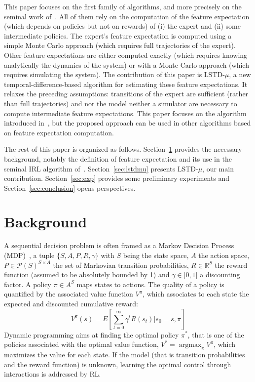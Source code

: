 \documentclass{jfpda2011}
\newcommand{\argmax}{\operatorname*{argmax}} %
\begin{document}
This paper focuses on the first family of algorithms, and more
precisely on the seminal work of~\citet{abbeel2004apprenticeship}. All of them
rely on the computation of the feature expectation (which depends on
policies but not on rewards) of (i) the expert and (ii) some
intermediate policies. The expert's feature expectation is computed
using a simple Monte Carlo approach (which requires full
trajectories of the expert). Other feature expectations are either
computed exactly (which requires knowing analytically the dynamics
of the system) or with a Monte Carlo approach (which requires simulating the system). The contribution of this paper is LSTD-$\mu$,
a new temporal-difference-based algorithm for estimating these feature
expectations. It relaxes the preceding assumptions: transitions
of the expert are sufficient (rather than full trajectories) and nor
the model neither a simulator are necessary to compute intermediate
feature expectations. This paper focuses on the algorithm introduced
in~\citep{abbeel2004apprenticeship}, but the proposed
approach can be used in other algorithms based on feature
expectation computation.

The rest of this paper is organized as follows.
Section~\ref{sec:back} provides the necessary background,
notably the definition of feature expectation and its use in the
seminal IRL algorithm of~\citet{abbeel2004apprenticeship}.
Section~\ref{sec:lstdmu} presents LSTD-$\mu$, our main contribution.
Section~\ref{sec:exp} provides some preliminary experiments and
Section~\ref{sec:conclusion} opens perspectives.


\section{Background}
\label{sec:back}
A sequential decision problem is often framed as a Markov Decision
Process (MDP)~\citep{puterman1994markov}, a tuple
$\{S,A,P,R,\gamma\}$ with $S$ being the state space, $A$ the action
space, $P\in\mathcal{P}(S)^{S\times A}$ the set of Markovian
transition probabilities, $R\in\mathbb{R}^S$ the reward function
(assumed to be absolutely bounded by 1) and $\gamma\in[0,1[$ a
discounting factor. A policy $\pi\in A^S$ maps states to actions. The
quality of a policy is quantified by the associated value function
$V^\pi$, which associates to each state the expected and discounted
cumulative reward:
\begin{equation}
  V^\pi(s) = E[\sum_{t=0}^\infty \gamma^t R(s_t)|s_0=s, \pi]
\end{equation}
Dynamic programming aims at finding the optimal policy $\pi^*$, that
is one of the policies associated with the optimal value function,
$V^* = \argmax_\pi V^\pi$, which maximizes the value for each state.
If the model (that is transition probabilities and the reward
function) is unknown, learning the optimal control through
interactions is addressed by RL.
\end{document}
